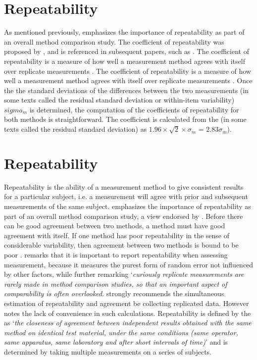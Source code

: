 \documentclass[12pt, a4paper]{report}
\theoremstyle{plain}
\theoremstyle{definition}
\theoremstyle{remark}
\begin{document}
	\section{Repeatability}
	As mentioned previously, \citet{Barnhart} emphasizes the importance of repeatability as part of an overall method comparison study. The coefficient of repeatability was proposed by \citet{BA99}, and is referenced in subsequent papers, such as \citet{BXC2008}. The coefficient of repeatability is a measure of how well a
	measurement method agrees with itself over replicate measurements
	\citep{BA99}. The coefficient of repeatability is a measure of how well a
	measurement method agrees with itself over replicate measurements
	\citep{BA99}. Once the the standard deviations of the differences between the two measurements (in some texts called the residual standard deviation or within-item variability) $sigma_m$ is determined, the
	computation of the coefficients of repeatability for both methods
	is straightforward. The coefficient is calculated from the (in some texts called the residual standard deviation) as  $1.96 \times \sqrt{2} \times \sigma_m$ = $2.83 \sigma_m$).
	
		\section{Repeatability}
		Repeatability is the ability of a measurement method to give consistent results for a particular subject, i.e. a measurement will agree with prior and subsequent measurements of the same subject. \citet{Barnhart} emphasizes the importance of repeatability as part of an overall method comparison study, a view endorsed by \citet{BXC2008}. Before there can be good agreement between two methods, a method must have good agreement with itself. If one method has poor repeatability in the sense of considerable
		variability, then agreement between two methods is bound to be
		poor \citep{ARoy2009}. \citet{Barnhart} remarks that it is important to report repeatability when assessing
		measurement, because it measures the purest form of random error
		not influenced by other factors, while further remarking `\textit{curiously replicate measurements are rarely made in method comparison studies, so that an important aspect of comparability is often overlooked}. \citet{BA99} strongly recommends the simultaneous estimation of repeatability and agreement be collecting replicated data.
		However \citet{ARoy2009} notes the lack of convenience in such calculations. 	Repeatability is defined by the \citet{IUPAC} as `\textit{the closeness of agreement between independent results obtained with the same method on identical test material, under the same conditions (same
			operator, same apparatus, same laboratory and after short intervals of time)}'  and is determined by taking multiple measurements on a series of subjects.
		
\end{document}
